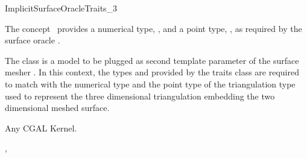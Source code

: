 

\begin{ccRefConcept}{ImplicitSurfaceOracleTraits_3}


\ccDefinition
  
The concept \ccRefName\ provides a numerical type, ,
and a point type, ,
as  required by the surface oracle
.

The class 
is a model to be plugged 
as  second template parameter of the surface mesher
. 
In this context, the types  and 
provided by the traits class are required to match with the numerical type
and the point type of the triangulation type 
used to represent the three dimensional triangulation embedding
the two dimensional meshed surface.



\ccTypes

\ccGlue
{}





\ccHasModels

Any CGAL Kernel.


\ccSeeAlso

,\\



\end{ccRefConcept}
